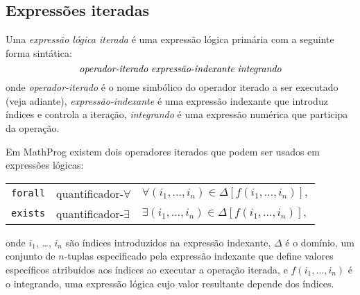 \documentclass[11pt, brazil]{report}
\begin{document}
\subsection{Expressões iteradas}

Uma {\it expressão lógica iterada} é uma expressão lógica primária
com a seguinte forma sintática:
$$\mbox{{\it operador-iterado} {\it expressão-indexante}
{\it integrando}}$$
onde {\it operador-iterado} é o nome simbólico do operador iterado
a ser executado (veja adiante), {\it expressão-indexante} é uma
expressão indexante que introduz índices e controla a iteração, \linebreak
{\it integrando} é uma expressão numérica que participa da operação.

Em MathProg existem dois operadores iterados que podem ser usados
em expressões lógicas:

%

{\def\arraystretch{1.4}
\noindent\hfil
\begin{tabular}{@{}lll@{}}
{\tt forall}&quantificador-$\forall$&$\displaystyle
\forall(i_1,\dots,i_n)\in\Delta[f(i_1,\dots,i_n)],$\\
{\tt exists}&quantificador-$\exists$&$\displaystyle
\exists(i_1,\dots,i_n)\in\Delta[f(i_1,\dots,i_n)],$\\
\end{tabular}
}


\noindent onde $i_1$, \dots, $i_n$ são índices introduzidos na
expressão indexante, $\Delta$ é o domínio, um conjunto de $n$-tuplas
especificado pela expressão indexante que define valores específicos
atribuídos aos índices ao executar a operação iterada, e
$f(i_1,\dots,i_n)$ é o integrando, uma expressão lógica cujo
valor resultante depende dos índices.
\end{document}
